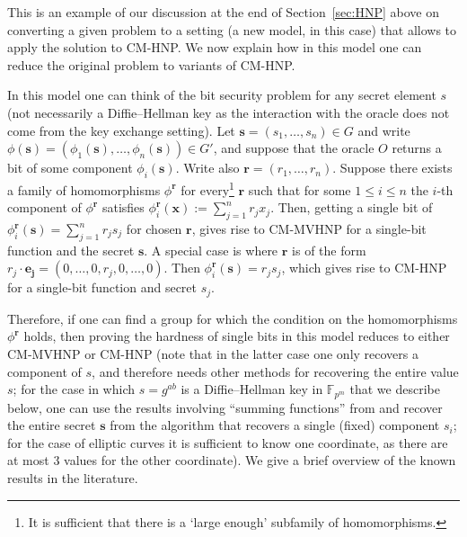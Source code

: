\documentclass[11pt]{article}
\theoremstyle{definition}
\newcommand{\F}{{\mathbb{F}}}
\begin{document}
This is an example of our discussion at the end of Section~\ref{sec:HNP} above on converting a given problem to a setting (a new model, in this case) that allows to apply the solution to CM-HNP. We now explain how in this model one can reduce the original problem to variants of CM-HNP.

In this model one can think of the bit security problem for any secret element $s$ (not necessarily a Diffie--Hellman key as the interaction with the oracle does not come from the key exchange setting). Let $\textbf{s} = (s_1,\ldots,s_n) \in G$ and write $\phi(\textbf{s})=(\phi_1(\textbf{s}),\ldots,\phi_n(\textbf{s})) \in G'$, and suppose that the oracle $O$ returns a bit of some component $\phi_i(\textbf{s})$. Write also $\textbf{r}=(r_1,\ldots,r_n)$.
Suppose there exists a family of homomorphisms $\phi^\textbf{r}$ for every\footnote{It is sufficient that there is a `large enough' subfamily of homomorphisms.} $\textbf{r}$ such that for some $1 \leq i \leq n$ the $i$-th component of $\phi^\textbf{r}$ satisfies $\phi^\textbf{r}_i(\textbf{x}) := \sum_{j=1}^n r_j x_j$. Then, getting a single bit of $\phi^\textbf{r}_i(\textbf{s}) = \sum_{j=1}^n r_j s_j$ for chosen $\textbf{r}$, gives rise to CM-MVHNP for a single-bit function and the secret $\textbf{s}$. A special case is where $\textbf{r}$ is of the form $r_j \cdot \textbf{e}\boldsymbol{_j}=(0,\ldots,0,r_j,0,\ldots,0)$. Then $\phi^\textbf{r}_i(\textbf{s}) = r_js_j$, which gives rise to CM-HNP for a single-bit function and secret $s_j$.

Therefore, if one can find a group for which the condition on the homomorphisms $\phi^\textbf{r}$ holds, then proving the hardness of single bits in this model reduces to either CM-MVHNP or CM-HNP (note that in the latter case one only recovers a component of $s$, and therefore needs other methods for recovering the entire value $s$; for the case in which $s = g^{ab}$ is a Diffie--Hellman key in $\F_{p^m}$ that we describe below, one can use the results involving ``summing functions'' from \cite{Eric-Verheul} and recover the entire secret $\textbf{s}$ from the algorithm that recovers a single (fixed) component $s_i$; for the case of elliptic curves it is sufficient to know one coordinate, as there are at most $3$ values for the other coordinate). We give a brief overview of the known results in the literature.
\end{document}
